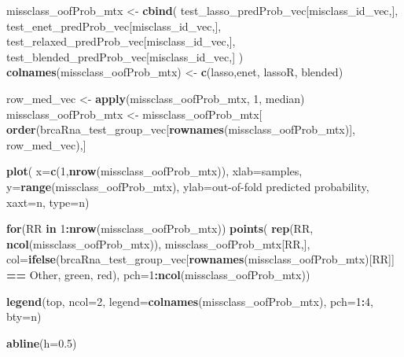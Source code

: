 \documentclass[
]{book}
\newenvironment{Shaded}{\begin{snugshade}}{\end{snugshade}}
\newcommand{\ControlFlowTok}[1]{\textcolor[rgb]{0.13,0.29,0.53}{\textbf{#1}}}
\newcommand{\DataTypeTok}[1]{\textcolor[rgb]{0.13,0.29,0.53}{#1}}
\newcommand{\DecValTok}[1]{\textcolor[rgb]{0.00,0.00,0.81}{#1}}
\newcommand{\FloatTok}[1]{\textcolor[rgb]{0.00,0.00,0.81}{#1}}
\newcommand{\KeywordTok}[1]{\textcolor[rgb]{0.13,0.29,0.53}{\textbf{#1}}}
\newcommand{\NormalTok}[1]{#1}
\newcommand{\OperatorTok}[1]{\textcolor[rgb]{0.81,0.36,0.00}{\textbf{#1}}}
\newcommand{\StringTok}[1]{\textcolor[rgb]{0.31,0.60,0.02}{#1}}
\begin{document}
\begin{Shaded}
\begin{Highlighting}[]
\NormalTok{missclass\_oofProb\_mtx <{-}}\StringTok{ }\KeywordTok{cbind}\NormalTok{(}
\NormalTok{ test\_lasso\_predProb\_vec[misclass\_id\_vec,],}
\NormalTok{ test\_enet\_predProb\_vec[misclass\_id\_vec,],}
\NormalTok{ test\_relaxed\_predProb\_vec[misclass\_id\_vec,],}
\NormalTok{ test\_blended\_predProb\_vec[misclass\_id\_vec,]}
\NormalTok{)}
\KeywordTok{colnames}\NormalTok{(missclass\_oofProb\_mtx) <{-}}\StringTok{ }\KeywordTok{c}\NormalTok{(}\StringTok{\textquotesingle{}lasso\textquotesingle{}}\NormalTok{,}\StringTok{\textquotesingle{}enet\textquotesingle{}}\NormalTok{, }\StringTok{\textquotesingle{}lassoR\textquotesingle{}}\NormalTok{, }\StringTok{\textquotesingle{}blended\textquotesingle{}}\NormalTok{)}

\NormalTok{row\_med\_vec <{-}}\StringTok{ }\KeywordTok{apply}\NormalTok{(missclass\_oofProb\_mtx, }\DecValTok{1}\NormalTok{, median)}
\NormalTok{missclass\_oofProb\_mtx <{-}}\StringTok{ }\NormalTok{missclass\_oofProb\_mtx[}
  \KeywordTok{order}\NormalTok{(brcaRna\_test\_group\_vec[}\KeywordTok{rownames}\NormalTok{(missclass\_oofProb\_mtx)], row\_med\_vec),]}

\KeywordTok{plot}\NormalTok{(}
 \DataTypeTok{x=}\KeywordTok{c}\NormalTok{(}\DecValTok{1}\NormalTok{,}\KeywordTok{nrow}\NormalTok{(missclass\_oofProb\_mtx)), }\DataTypeTok{xlab=}\StringTok{\textquotesingle{}samples\textquotesingle{}}\NormalTok{,}
 \DataTypeTok{y=}\KeywordTok{range}\NormalTok{(missclass\_oofProb\_mtx), }\DataTypeTok{ylab=}\StringTok{\textquotesingle{}out{-}of{-}fold predicted probability\textquotesingle{}}\NormalTok{,}
 \DataTypeTok{xaxt=}\StringTok{\textquotesingle{}n\textquotesingle{}}\NormalTok{, }\DataTypeTok{type=}\StringTok{\textquotesingle{}n\textquotesingle{}}\NormalTok{)}

\ControlFlowTok{for}\NormalTok{(RR }\ControlFlowTok{in} \DecValTok{1}\OperatorTok{:}\KeywordTok{nrow}\NormalTok{(missclass\_oofProb\_mtx))}
\KeywordTok{points}\NormalTok{(}
 \KeywordTok{rep}\NormalTok{(RR, }\KeywordTok{ncol}\NormalTok{(missclass\_oofProb\_mtx)), }
\NormalTok{ missclass\_oofProb\_mtx[RR,],}
 \DataTypeTok{col=}\KeywordTok{ifelse}\NormalTok{(brcaRna\_test\_group\_vec[}\KeywordTok{rownames}\NormalTok{(missclass\_oofProb\_mtx)[RR]] }\OperatorTok{==}\StringTok{ \textquotesingle{}Other\textquotesingle{}}\NormalTok{,}
  \StringTok{\textquotesingle{}green\textquotesingle{}}\NormalTok{, }\StringTok{\textquotesingle{}red\textquotesingle{}}\NormalTok{),}
 \DataTypeTok{pch=}\DecValTok{1}\OperatorTok{:}\KeywordTok{ncol}\NormalTok{(missclass\_oofProb\_mtx))}

\KeywordTok{legend}\NormalTok{(}\StringTok{\textquotesingle{}top\textquotesingle{}}\NormalTok{, }\DataTypeTok{ncol=}\DecValTok{2}\NormalTok{, }\DataTypeTok{legend=}\KeywordTok{colnames}\NormalTok{(missclass\_oofProb\_mtx), }
 \DataTypeTok{pch=}\DecValTok{1}\OperatorTok{:}\DecValTok{4}\NormalTok{, }\DataTypeTok{bty=}\StringTok{\textquotesingle{}n\textquotesingle{}}\NormalTok{)}

\KeywordTok{abline}\NormalTok{(}\DataTypeTok{h=}\FloatTok{0.5}\NormalTok{)}
\end{Highlighting}
\end{Shaded}
\end{document}

